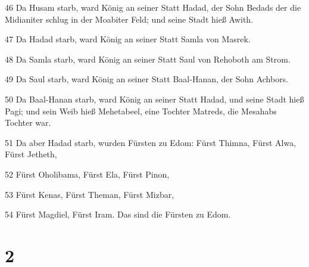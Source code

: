 \par 46 Da Husam starb, ward König an seiner Statt Hadad, der Sohn Bedads der die Midianiter schlug in der Moabiter Feld; und seine Stadt hieß Awith.
\par 47 Da Hadad starb, ward König an seiner Statt Samla von Masrek.
\par 48 Da Samla starb, ward König an seiner Statt Saul von Rehoboth am Strom.
\par 49 Da Saul starb, ward König an seiner Statt Baal-Hanan, der Sohn Achbors.
\par 50 Da Baal-Hanan starb, ward König an seiner Statt Hadad, und seine Stadt hieß Pagi; und sein Weib hieß Mehetabeel, eine Tochter Matreds, die Mesahabs Tochter war.
\par 51 Da aber Hadad starb, wurden Fürsten zu Edom: Fürst Thimna, Fürst Alwa, Fürst Jetheth,
\par 52 Fürst Oholibama, Fürst Ela, Fürst Pinon,
\par 53 Fürst Kenas, Fürst Theman, Fürst Mizbar,
\par 54 Fürst Magdiel, Fürst Iram. Das sind die Fürsten zu Edom.

\chapter{2}

